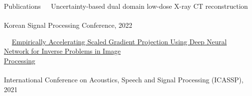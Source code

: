 \documentclass{resume} %
\newcommand{\mycolor}[1]{\textcolor{myurlcolor}{#1}}
\begin{document}
\begin{rSection}{Publications {}}
\textbullet~\,\, {\mycolor{Uncertainty-based dual domain low-dose X-ray CT reconstruction}}
\\ 
\\ \hspace*{1.5em}Korean Signal Processing Conference, 2022

\textbullet~\,\, \href{https://ieeexplore.ieee.org/document/9415023}{Empirically Accelerating Scaled Gradient Projection Using Deep Neural Network for Inverse Problems in Image \\ \hspace*{1.5em}Processing}
\\ 
\\ \hspace*{1.5em}International Conference on Acoustics, Speech and Signal Processing (ICASSP), 2021 
\end{rSection} 
\end{document}
